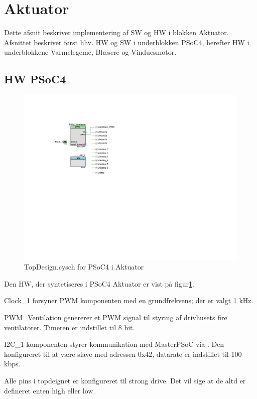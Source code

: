 \section{Aktuator} \label{sec:AktImpl}

Dette afsnit beskriver implementering af SW og HW i blokken Aktuator. Afsnittet beskriver først hhv. HW og SW i underblokken PSoC4, herefter HW i underblokkene Varmelegeme, Blæsere og Vinduesmotor.

\subsection{HW PSoC4}
\begin{figure}[h]
\centering 
\includegraphics[width={\textwidth-6cm}, trim = 110 320 480 100, clip=true] {../fig/TopDesign_Aktuator.pdf}
\caption{TopDesign.cysch for PSoC4 i Aktuator}
\label{fig:topdesign_aktuator}
\end{figure}

Den HW, der syntetiseres i PSoC4 Aktuator er vist på figur\ref{fig:topdesign_aktuator}. 

Clock\_1 forsyner PWM komponenten med en grundfrekvens; der er valgt 1 kHz.

PWM\_Ventilation genererer et PWM signal til styring af drivhusets fire ventilatorer. Timeren er indstillet til 8 bit.  

I2C\_1 komponenten styrer kommunikation med MasterPSoC via \IIC. 
Den konfigureret til at være slave med adressen 0x42, datarate er indstillet til 100 kbps.

Alle pins i topdeignet er konfigureret til strong drive. 
Det vil sige at de altd er defineret enten high eller low.

